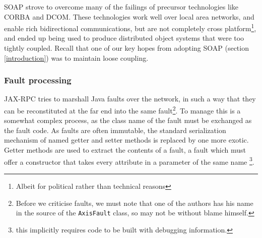 
SOAP strove to overcome many of the failings of precursor technologies
like CORBA and DCOM. These technologies work well over local area
networks, and enable rich bidirectional communications, but are not
completely cross platform\footnote{Albeit for political rather than
technical reasons}, and ended up being used to produce distributed
object systems that were too tightly coupled. Recall that one of our
key hopes from adopting SOAP (section \ref{introduction}) was to
maintain loose coupling.





\subsubsection{Fault processing}
\label{objections:soap-not-rmi:faults}

JAX-RPC tries to marshall Java faults over the network, in such a way
that they can be reconstituted at the far end into the same
fault\footnote{Before we criticise faults, we must note that one of
the authors has his name in the source of the {\tt AxisFault} class,
so may not be without blame himself.}. To manage this is a somewhat
complex process, as the class name of the fault must be exchanged as
the fault code. As faults are often immutable, the standard
serialization mechanism of named getter and setter methods is replaced
by one more exotic. Getter methods are used to extract the contents of a
fault, a fault which must offer a constructor that takes every attribute
in a parameter of the same name
\footnote{this implicitly requires code to be built with debugging information.}. 

